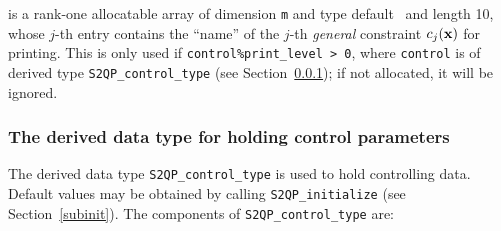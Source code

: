 \documentclass{galahad}
\newcommand{\packagename}{S2QP}
\begin{document}
\begin{description}
 is a rank-one allocatable array of dimension {\tt m} and
type default \character\ and length 10, whose $j$-th entry contains
the ``name'' of the $j$-th {\em general} constraint $c_j({\mathbf{x}})$ for
printing.  This is only used if {\tt control\%print\_level > 0}, where
{\tt control} is of derived type {\tt \packagename\_control\_type}
(see Section~\ref{typecontrol}); if not allocated, it will be ignored.

\end{description}


\subsubsection{The derived data type for holding control 
 parameters}\label{typecontrol}
The derived data type 
{\tt \packagename\_control\_type} 
is used to hold controlling data. Default values may be obtained by calling 
{\tt \packagename\_initialize}
(see Section~\ref{subinit}). The components of 
{\tt \packagename\_control\_type} 
are:
\end{document}
